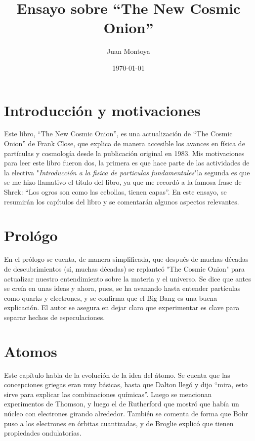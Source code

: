 \documentclass[12pt]{article}
\title{Ensayo sobre “The New Cosmic Onion”}
\author{Juan Montoya}
\date{\today}
\begin{document}
\maketitle

\section{Introducción y motivaciones}
Este libro, “The New Cosmic Onion”, es una actualización de “The Cosmic Onion” de Frank Close, que explica de manera accesible los avances en física de partículas y cosmología desde la publicación original en 1983. Mis motivaciones para leer este libro fueron dos, la primera\newcommand{\comment}[1]{}\comment{se desespera, se encojona si se lo hecho afuera} es que hace parte de las actividades de la electiva "\textit{Introducción a la fisica de particulas fundamentales}"la segunda es que se me hizo llamativo el título del libro, ya que me recordó a la famosa frase de Shrek: “Los ogros son como las cebollas, tienen capas”. En este ensayo, se resumirán los capítulos del libro y se comentarán algunos aspectos relevantes.

\section{Prológo}
En el prólogo se cuenta, de manera simplificada, que después de muchas décadas de descubrimientos (sí, muchas décadas) se replanteó "The Cosmic Onion" para actualizar nuestro entendimiento sobre la materia y el universo. Se dice que antes se creía en unas ideas y ahora, pues, se ha avanzado hasta entender partículas como quarks y electrones, y se confirma que el Big Bang es una buena explicación. El autor se asegura en dejar claro que experimentar es clave para separar hechos de especulaciones.

\section{Atomos}
Este capítulo habla de la evolución de la idea del átomo. Se cuenta que las concepciones griegas eran muy básicas, hasta que Dalton llegó y dijo “mira, esto sirve para explicar las combinaciones químicas”. Luego se mencionan experimentos de Thomson, y luego el de Rutherford que mostró que había un núcleo con electrones girando alrededor. También se comenta de forma que Bohr puso a los electrones en órbitas cuantizadas, y de Broglie explicó que tienen propiedades ondulatorias.
\end{document}
